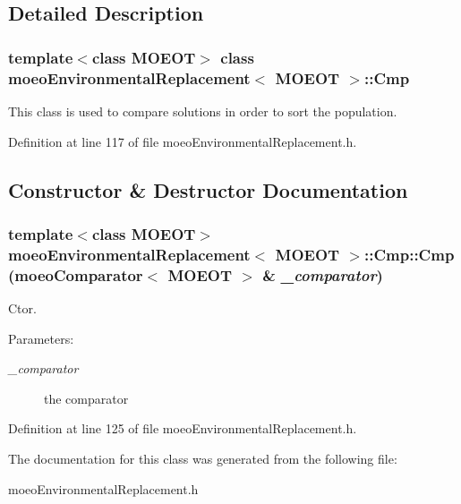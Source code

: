 \subsection{Detailed Description}
\subsubsection*{template$<$class MOEOT$>$ class moeo\-Environmental\-Replacement$<$ MOEOT $>$::Cmp}

This class is used to compare solutions in order to sort the population. 



Definition at line 117 of file moeo\-Environmental\-Replacement.h.

\subsection{Constructor \& Destructor Documentation}
\subsubsection{\setlength{\rightskip}{0pt plus 5cm}template$<$class MOEOT$>$ {\bf moeo\-Environmental\-Replacement}$<$ MOEOT $>$::Cmp::Cmp ({\bf moeo\-Comparator}$<$ MOEOT $>$ \& {\em \_\-comparator})\hspace{0.3cm}{\tt  [inline]}}\label{classmoeoEnvironmentalReplacement_1_1Cmp_734409b8f04b599c5291520b5cfc9177}


Ctor. 

\begin{Desc}
\item[Parameters:]
\begin{description}
\item[{\em \_\-comparator}]the comparator \end{description}
\end{Desc}


Definition at line 125 of file moeo\-Environmental\-Replacement.h.

The documentation for this class was generated from the following file:\begin{CompactItemize}
\item 
moeo\-Environmental\-Replacement.h\end{CompactItemize}
